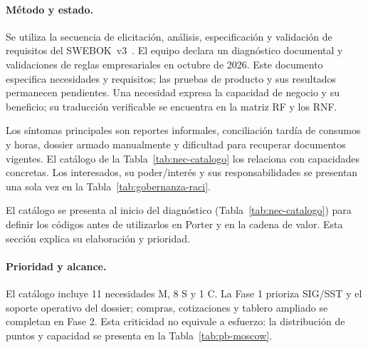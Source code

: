 \documentclass[12pt,letterpaper]{article}
\begin{document}
\paragraph{Método y estado.}
Se utiliza la secuencia de elicitación, análisis, especificación y validación de requisitos del SWEBOK~v3~\cite{swebok}. El equipo declara un diagnóstico documental y validaciones de reglas empresariales en octubre de 2026. Este documento especifica necesidades y requisitos; las pruebas de producto y sus resultados permanecen pendientes. Una necesidad expresa la capacidad de negocio y su beneficio; su traducción verificable se encuentra en la matriz RF y los RNF.

Los síntomas principales son reportes informales, conciliación tardía de consumos y horas, dossier armado manualmente y dificultad para recuperar documentos vigentes. El catálogo de la Tabla~\ref{tab:nec-catalogo} los relaciona con capacidades concretas. Los interesados, su poder/interés y sus responsabilidades se presentan una sola vez en la Tabla~\ref{tab:gobernanza-raci}.


El catálogo se presenta al inicio del diagnóstico (Tabla~\ref{tab:nec-catalogo}) para definir los códigos antes de utilizarlos en Porter y en la cadena de valor. Esta sección explica su elaboración y prioridad.

\paragraph{Prioridad y alcance.}
El catálogo incluye 11 necesidades M, 8 S y 1 C. La Fase 1 prioriza SIG/SST y el soporte operativo del dossier; compras, cotizaciones y tablero ampliado se completan en Fase 2. Esta criticidad no equivale a esfuerzo: la distribución de puntos y capacidad se presenta en la Tabla~\ref{tab:pb-moscow}.
\end{document}
